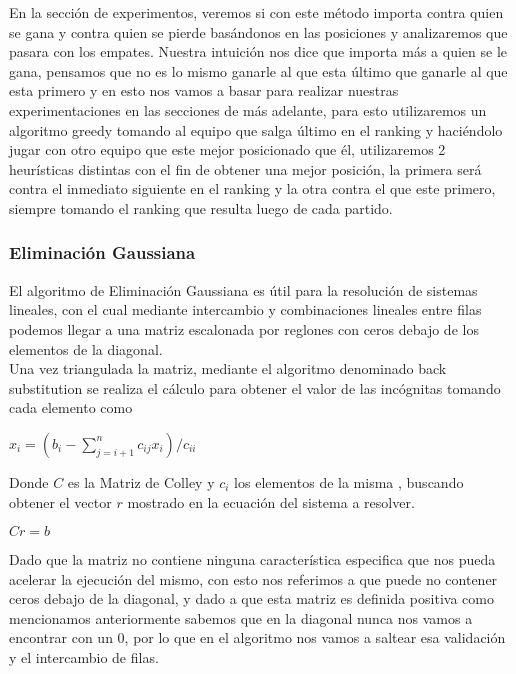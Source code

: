 En la sección de experimentos, veremos si con este método importa contra quien se gana y contra quien se pierde basándonos en las posiciones y analizaremos que pasara con los empates. Nuestra intuición nos dice que importa más a quien se le gana, pensamos que no es lo mismo ganarle al que esta último que ganarle al que esta primero y en esto nos vamos a basar para realizar nuestras experimentaciones en las secciones de más adelante, para esto utilizaremos un algoritmo greedy tomando al equipo que salga último en el ranking y haciéndolo jugar con otro equipo que este mejor posicionado que él, utilizaremos 2 heurísticas distintas con el fin de obtener una mejor posición, la primera será contra el inmediato siguiente en el ranking y la otra contra el que este primero, siempre tomando el ranking que resulta luego de cada partido.


\subsubsection{Eliminación Gaussiana}

El algoritmo de Eliminación Gaussiana es útil para la resolución de sistemas lineales, con el cual mediante intercambio y combinaciones lineales entre filas podemos llegar a una matriz escalonada por reglones con ceros debajo de los elementos de la diagonal.\\
Una vez triangulada la matriz, mediante el algoritmo denominado back substitution se realiza el cálculo para obtener el valor de las incógnitas tomando cada elemento como\\

\begin{center}
$x_i = (b_i - \sum\limits_{j = i + 1}^n c_{ij}x_i) / c_{ii}$ \\
\end{center}

Donde $C$ es la Matriz de Colley y $c_i$ los elementos de la misma , buscando obtener el vector $r$ mostrado en la ecuación del sistema a resolver. 

\begin{center}
$Cr=b$
\end{center}


Dado que la matriz no contiene ninguna característica especifica que nos pueda acelerar la ejecución del mismo, con esto nos referimos a que puede no contener ceros debajo de la diagonal, y dado a que esta matriz es definida positiva como mencionamos anteriormente sabemos que en la diagonal nunca nos vamos a encontrar con un 0, por lo que en el algoritmo nos vamos a saltear esa validación y el intercambio de filas.

